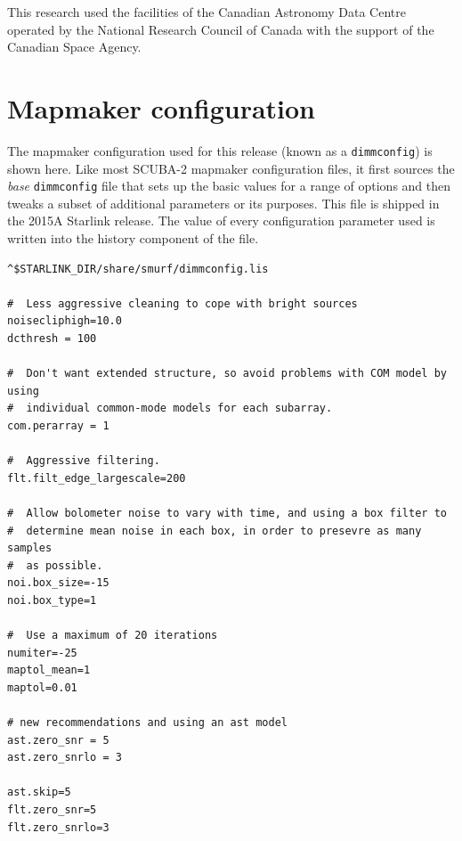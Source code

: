 \documentclass[twocolumn,times]{aastex6}
\begin{document}
This research used the facilities of the Canadian Astronomy Data
Centre operated by the National Research Council of Canada with the
support of the Canadian Space Agency.
\vspace{5mm}








\clearpage
\appendix


\section{Mapmaker configuration}
\label{app:config}
The mapmaker configuration used for this release (known as a
\texttt{dimmconfig}) is shown here. Like most SCUBA-2 mapmaker
configuration files, it first sources the \emph{base}
\texttt{dimmconfig} file that sets up the basic values for a range of
options and then tweaks a subset of additional parameters or its
purposes. This file is shipped in the 2015A Starlink release. The
value of every configuration parameter used is written into the
history component of the file.

\begin{verbatim}
^$STARLINK_DIR/share/smurf/dimmconfig.lis

#  Less aggressive cleaning to cope with bright sources
noisecliphigh=10.0
dcthresh = 100

#  Don't want extended structure, so avoid problems with COM model by using
#  individual common-mode models for each subarray.
com.perarray = 1

#  Aggressive filtering.
flt.filt_edge_largescale=200

#  Allow bolometer noise to vary with time, and using a box filter to
#  determine mean noise in each box, in order to presevre as many samples
#  as possible.
noi.box_size=-15
noi.box_type=1

#  Use a maximum of 20 iterations
numiter=-25
maptol_mean=1
maptol=0.01

# new recommendations and using an ast model
ast.zero_snr = 5
ast.zero_snrlo = 3

ast.skip=5
flt.zero_snr=5
flt.zero_snrlo=3
\end{verbatim}
\end{document}
